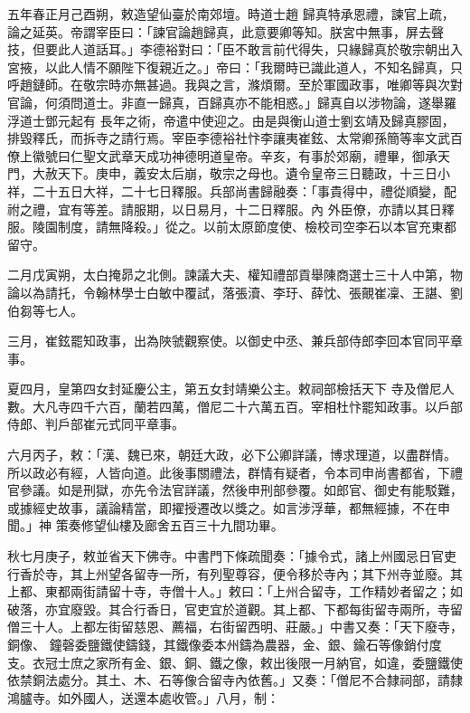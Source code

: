\begin{pinyinscope}
 五年春正月己酉朔，敕造望仙臺於南郊壇。時道士趙
 歸真特承恩禮，諫官上疏，論之延英。帝謂宰臣曰：「諫官論趙歸真，此意要卿等知。朕宮中無事，屏去聲技，但要此人道話耳。」李德裕對曰：「臣不敢言前代得失，只緣歸真於敬宗朝出入宮掖，以此人情不願陛下復親近之。」帝曰：「我爾時已識此道人，不知名歸真，只呼趙鏈師。在敬宗時亦無甚過。我與之言，滌煩爾。至於軍國政事，唯卿等與次對官論，何須問道士。非直一歸真，百歸真亦不能相惑。」歸真自以涉物論，遂舉羅浮道士鄧元起有
 長年之術，帝遣中使迎之。由是與衡山道士劉玄靖及歸真膠固，排毀釋氏，而拆寺之請行焉。宰臣李德裕社忭李讓夷崔鉉、太常卿孫簡等率文武百僚上徽號曰仁聖文武章天成功神德明道皇帝。辛亥，有事於郊廟，禮畢，御承天門，大赦天下。庚申，義安太后崩，敬宗之母也。遺令皇帝三日聽政，十三日小祥，二十五日大祥，二十七日釋服。兵部尚書歸融奏：「事貴得中，禮從順變，配祔之禮，宜有等差。請服期，以日易月，十二日釋服。內
 外臣僚，亦請以其日釋服。陵園制度，請無降殺。」從之。以前太原節度使、檢校司空李石以本官充東都留守。



 二月戊寅朔，太白掩昴之北側。諫議大夫、權知禮部貢舉陳商選士三十人中第，物論以為請托，令翰林學士白敏中覆試，落張瀆、李玗、薛忱、張覿崔凜、王諶、劉伯芻等七人。



 三月，崔鉉罷知政事，出為陜虢觀察使。以御史中丞、兼兵部侍郎李回本官同平章事。



 夏四月，皇第四女封延慶公主，第五女封靖樂公主。敕祠部檢括天下
 寺及僧尼人數。大凡寺四千六百，蘭若四萬，僧尼二十六萬五百。宰相杜忭罷知政事。以戶部侍郎、判戶部崔元式同平章事。



 六月丙子，敕：「漢、魏已來，朝廷大政，必下公卿詳議，博求理道，以盡群情。所以政必有經，人皆向道。此後事關禮法，群情有疑者，令本司申尚書都省，下禮官參議。如是刑獄，亦先令法官詳議，然後申刑部參覆。如郎官、御史有能駁難，或據經史故事，議論精當，即擢授遷改以獎之。如言涉浮華，都無經據，不在申聞。」神
 策奏修望仙樓及廊舍五百三十九間功畢。



 秋七月庚子，敕並省天下佛寺。中書門下條疏聞奏：「據令式，諸上州國忌日官吏行香於寺，其上州望各留寺一所，有列聖尊容，便令移於寺內；其下州寺並廢。其上都、東都兩街請留十寺，寺僧十人。」敕曰：「上州合留寺，工作精妙者留之；如破落，亦宜廢毀。其合行香日，官吏宜於道觀。其上都、下都每街留寺兩所，寺留僧三十人。上都左街留慈恩、薦福，右街留西明、莊嚴。」中書又奏：「天下廢寺，銅像、
 鐘磬委鹽鐵使鑄錢，其鐵像委本州鑄為農器，金、銀、鍮石等像銷付度支。衣冠士庶之家所有金、銀、銅、鐵之像，敕出後限一月納官，如違，委鹽鐵使依禁銅法處分。其土、木、石等像合留寺內依舊。」又奏：「僧尼不合隸祠部，請隸鴻臚寺。如外國人，送還本處收管。」八月，制：




\end{pinyinscope}
